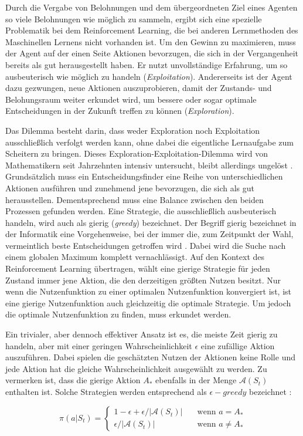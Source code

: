 Durch die Vergabe von Belohnungen und dem übergeordneten Ziel eines Agenten so viele Belohnungen wie möglich zu sammeln, ergibt sich eine spezielle Problematik bei dem Reinforcement Learning, die bei anderen Lernmethoden des Maschinellen Lernens nicht vorhanden ist. Um den Gewinn zu maximieren, muss der Agent auf der einen Seite Aktionen bevorzugen, die sich in der Vergangenheit bereits als gut herausgestellt haben. Er nutzt unvollständige Erfahrung, um so ausbeuterisch wie möglich zu handeln (\textit{Exploitation}). Andererseits ist der Agent dazu gezwungen, neue Aktionen auszuprobieren, damit der Zustands- und Belohungsraum weiter erkundet wird, um bessere oder sogar optimale Entscheidungen in der Zukunft treffen zu können (\textit{Exploration}). 
\par 
Das Dilemma besteht darin, dass weder Exploration noch Exploitation ausschließlich verfolgt werden kann, ohne dabei die eigentliche Lernaufgabe zum Scheitern zu bringen. Dieses Exploration-Exploitation-Dilemma wird von Mathematikern seit Jahrzehnten intensiv untersucht, bleibt allerdings ungelöst \cite[S.~3]{Sutton1998}. Grundsätzlich muss ein Entscheidungsfinder  eine Reihe von unterschiedlichen Aktionen ausführen und zunehmend jene bevorzugen, die sich als gut herausstellen. Dementsprechend muss eine Balance zwischen den beiden Prozessen gefunden werden.
Eine Strategie, die ausschließlich ausbeuterisch handeln, wird auch als gierig (\textit{greedy}) bezeichnet. Der Begriff \glqq gierig\grqq{} bezeichnet in der Informatik eine Vorgehenweise, bei der immer die, zum Zeitpunkt der Wahl, vermeintlich beste Entscheidungen getroffen wird \cite[S.~203]{greedy}. Dabei wird die Suche nach einem globalen Maximum komplett vernachlässigt. Auf den Kontext des Reinforcement Learning übertragen, wählt eine gierige Strategie für jeden Zustand immer jene Aktion, die den derzeitigen größten Nutzen besitzt. Nur wenn die Nutzenfunktion zu einer optimalen Nutzenfunktion konvergiert ist, ist eine gierige Nutzenfunktion auch gleichzeitig die optimale Strategie. Um jedoch die optimale Nutzenfunktion zu finden, muss erkundet werden.
\par
Ein trivialer, aber dennoch effektiver Ansatz ist es, die meiste Zeit gierig zu handeln, aber mit einer geringen Wahrscheinlichkeit $\epsilon$ eine zufällige Aktion auszuführen. Dabei spielen die geschätzten Nutzen der Aktionen keine Rolle und jede Aktion hat die gleiche Wahrscheinlichkeit ausgewählt zu werden. Zu vermerken ist, dass die gierige Aktion $A_*$ ebenfalls in der Menge $\mathcal{A}(S_t)$ enthalten ist. Solche Strategien werden entsprechend als $\epsilon-greedy$ bezeichnet \cite[S.~28]{Sutton1998}:

\begin{equation}\label{eq:greedyProbs}
    \pi(a|S_t) =   
        \begin{cases}
            1-\epsilon + \epsilon / |\mathcal{A}(S_t)|      & \quad \text{wenn } a = A_* \\
            \epsilon / |\mathcal{A}(S_t)|  & \quad \text{wenn } a \neq A_*
        \end{cases}
\end{equation}